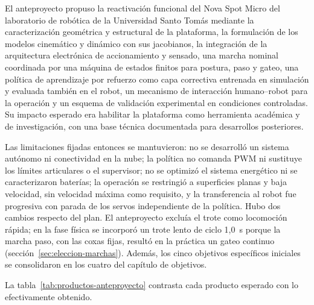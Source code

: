 El anteproyecto propuso la reactivación funcional del Nova Spot Micro del
laboratorio de robótica de la Universidad Santo Tomás mediante la
caracterización geométrica y estructural de la plataforma, la formulación de
los modelos cinemático y dinámico con sus jacobianos, la integración de la
arquitectura electrónica de accionamiento y sensado, una marcha nominal
coordinada por una máquina de estados finitos para postura, paso y gateo, una
política de aprendizaje por refuerzo como capa correctiva entrenada en
simulación y evaluada también en el robot, un mecanismo de interacción
humano--robot para la operación y un esquema de validación experimental en
condiciones controladas. Su impacto esperado era habilitar la plataforma como
herramienta académica y de investigación, con una base técnica documentada
para desarrollos posteriores.

Las limitaciones fijadas entonces se mantuvieron: no se desarrolló un sistema
autónomo ni conectividad en la nube; la política no comanda PWM ni sustituye
los límites articulares o el supervisor; no se optimizó el sistema energético
ni se caracterizaron baterías; la operación se restringió a superficies planas
y baja velocidad, sin velocidad máxima como requisito, y la transferencia al
robot fue progresiva con parada de los servos independiente de la política.
Hubo dos cambios respecto del plan. El anteproyecto excluía el trote como
locomoción rápida; en la fase física se incorporó un trote lento de ciclo
1{,}0~s porque la marcha paso, con las coxas fijas, resultó en la práctica un
gateo continuo (sección~\ref{sec:eleccion-marchas}).
Además, los cinco objetivos específicos iniciales se consolidaron en los
cuatro del capítulo de objetivos.

La tabla~\ref{tab:productos-anteproyecto} contrasta cada producto esperado con
lo efectivamente obtenido.

